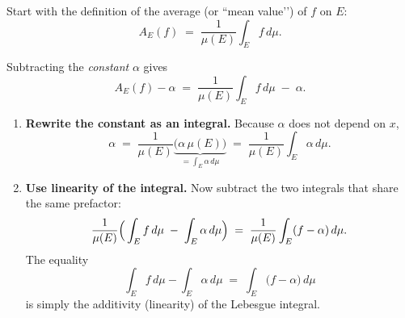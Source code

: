 \documentclass[12pt]{article}
\theoremstyle{definition} %
\theoremstyle{plain} %
\begin{document}
Start with the definition of the average (or “mean value’’) of $f$ on $E$:
\[
    A_E(f) \;=\; \frac{1}{\mu(E)}\int_E f\,d\mu .
\]

Subtracting the \emph{constant} $\alpha$ gives
\[
    A_E(f)-\alpha
    \;=\;
    \frac{1}{\mu(E)}\int_E f\,d\mu
    \;-\;
    \alpha .
\]

\begin{enumerate}
    \item \textbf{Rewrite the constant as an integral.}  
          Because $\alpha$ does not depend on $x$,
          \[
              \alpha
              \;=\;
              \frac{1}{\mu(E)}\underbrace{\bigl(\alpha\,\mu(E)\bigr)}_{\displaystyle=\int_E \alpha\,d\mu}
              \;=\;
              \frac{1}{\mu(E)}\int_E \alpha\,d\mu .
          \]

    \item \textbf{Use linearity of the integral.}  
          Now subtract the two integrals that share the same prefactor:
          \[
              \frac{1}{\mu(E)}
              \Bigl(\,\int_E f\,d\mu \;-\; \int_E \alpha\,d\mu \Bigr)
              \;=\;
              \frac{1}{\mu(E)}
              \int_E (f-\alpha)\,d\mu .
          \]
          The equality
          \[
              \int_E f\,d\mu - \int_E \alpha\,d\mu
              \;=\;
              \int_E\bigl(f-\alpha\bigr)\,d\mu
          \]
          is simply the additivity (linearity) of the Lebesgue integral.
\end{enumerate}
\end{document}
